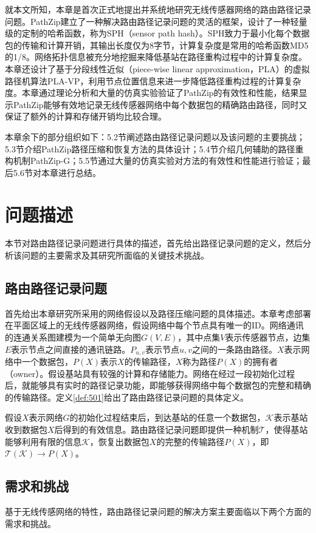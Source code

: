 就本文所知，本章是首次正式地提出并系统地研究无线传感器网络的路由路径记录问题。PathZip建立了一种解决路由路径记录问题的灵活的框架，设计了一种轻量级的定制的哈希函数，称为SPH（sensor path hash）。SPH致力于最小化每个数据包的传输和计算开销，其输出长度仅为8字节，计算复杂度是常用的哈希函数MD5的1/8。网络拓扑信息被充分地挖掘来降低基站在路径重构过程中的计算复杂度。本章还设计了基于分段线性近似（piece-wise linear approximation，PLA）的虚拟路径机算法PLA-VP，利用节点位置信息来进一步降低路径重构过程的计算复杂度。本章通过理论分析和大量的仿真实验验证了PathZip的有效性和性能，结果显示PathZip能够有效地记录无线传感器网络中每个数据包的精确路由路径，同时又保证了额外的计算和存储开销均比较合理。

本章余下的部分组织如下：5.2节阐述路由路径记录问题以及该问题的主要挑战；5.3节介绍PathZip路径压缩和恢复方法的具体设计；5.4节介绍几何辅助的路径重构机制PathZip-G；5.5节通过大量的仿真实验对方法的有效性和性能进行验证；最后5.6节对本章进行总结。
\section{问题描述}
本节对路由路径记录问题进行具体的描述，首先给出路径记录问题的定义，然后分析该问题的主要需求及其研究所面临的关键技术挑战。
\subsection{路由路径记录问题}
首先给出本章研究所采用的网络假设以及路径压缩问题的具体描述。本章考虑部署在平面区域上的无线传感器网络，假设网络中每个节点具有唯一的ID。网络通讯的连通关系图建模为一个简单无向图$G(V,E)$，其中点集$V$表示传感器节点，边集$E$表示节点之间直接的通讯链路。$P_{u,v}$表示节点$u,v$之间的一条路由路径。$X$表示网络中一个数据包，$P(X)$表示$X$的传输路径，$X$称为路径$P(X)$的拥有者（owner）。假设基站具有较强的计算和存储能力。网络在经过一段初始化过程后，就能够具有实时的路径记录功能，即能够获得网络中每个数据包的完整和精确的传输路径。定义\ref{def:501}给出了路由路径记录问题的具体定义。
\begin{definition}\label{def:501}
假设$X$表示网络$G$的初始化过程结束后，到达基站的任意一个数据包，$\mathcal{K}$表示基站收到数据包$X$后得到的有效信息。路由路径记录问题即提供一种机制$\mathcal{T}$，使得基站能够利用有限的信息$\mathcal{K}$，恢复出数据包$X$的完整的传输路径$P(X)$，即$\mathcal{T}(\mathcal{K})\to{P(X)}$。
\end{definition}
\subsection{需求和挑战}
基于无线传感网络的特性，路由路径记录问题的解决方案主要面临以下两个方面的需求和挑战。
